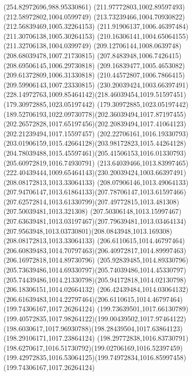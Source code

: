 {    \lineto(254.82972696,988.95330861)
    \closepath
    \moveto(211.97772803,1002.89597493)
    \lineto(212.58972802,1004.0599749)
    \lineto(213.73239466,1004.70930822)
    \lineto(212.56839469,1005.32264153)
    \lineto(211.91906137,1006.46397484)
    \lineto(211.30706138,1005.30264153)
    \lineto(210.16306141,1004.65064155)
    \lineto(211.32706138,1004.0399749)
    \closepath
    \moveto(209.12706144,1008.0639748)
    \lineto(208.68039478,1007.21730815)
    \lineto(207.8483948,1006.7426415)
    \lineto(208.69506145,1006.29730818)
    \lineto(209.16839477,1005.4653082)
    \lineto(209.61372809,1006.31330818)
    \lineto(210.44572807,1006.7866415)
    \lineto(209.59906143,1007.23330815)
    \closepath
    \moveto(230.20039424,1003.66397491)
    \curveto(228.14972763,1009.85464142)(218.46039454,1019.51597451)(179.30972885,1023.05197442)
    \curveto(179.30972885,1023.05197442)(189.52706193,1022.09730778)(202.36039494,1017.87197455)
    \curveto(202.26572828,1017.65197456)(202.20839494,1017.41064123)(202.21239494,1017.15597457)
    \curveto(202.22706161,1016.19330793)(203.01906159,1015.42664128)(203.98172823,1015.44264128)
    \curveto(204.78039488,1015.45597461)(205.41506153,1016.01330793)(205.60972819,1016.74930791)
    \curveto(213.64039466,1013.83997465)(222.40439444,1009.65464143)(230.20039424,1003.66397491)
    \moveto(208.08172813,1013.33064133)
    \curveto(208.07906146,1013.49064133)(207.94706147,1013.61864133)(207.78706147,1013.61597466)
    \curveto(207.62572814,1013.61330799)(207.49772815,1013.481308)(207.50039481,1013.321308)
    \curveto(207.50306148,1013.15997467)(207.63639481,1013.03197467)(207.79639481,1013.03464134)
    \curveto(207.9563948,1013.03730801)(208.0843948,1013.169308)(208.08172813,1013.33064133)
    \moveto(206.6110615,1014.46797464)
    \curveto(206.60839483,1014.70797463)(206.40972817,1014.89997463)(206.16972818,1014.89730796)
    \curveto(205.92839485,1014.89330796)(205.73639486,1014.69330797)(205.74039486,1014.45330797)
    \curveto(205.74439486,1014.21330798)(205.94172818,1014.02130798)(206.18306151,1014.02664132)
    \curveto(206.42439484,1014.03064132)(206.61639483,1014.22797464)(206.6110615,1014.46797464)
    \moveto(199.74306167,1017.26264124)
    \curveto(199.73639501,1017.66130789)(199.40572835,1017.98264122)(199.00439502,1017.97464122)
    \curveto(198.6030617,1017.96930788)(198.28439504,1017.63864123)(198.29106171,1017.23864124)
    \curveto(198.29772838,1016.83730791)(198.6270617,1016.51730792)(199.02706169,1016.52397459)
    \curveto(199.42972835,1016.53064125)(199.74972834,1016.85997458)(199.74306167,1017.26264124)
}

